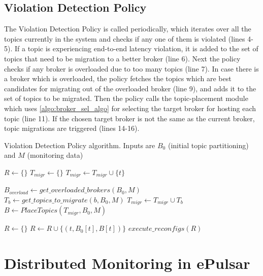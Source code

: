 \subsection{Violation Detection Policy}
The Violation Detection Policy is called periodically, which iterates over all the topics currently in the system and checks if any one of them is violated (lines 4-5). If a topic is experiencing end-to-end latency violation, it is added to the set of topics that need to be migration to a better broker (line 6). Next the policy checks if any broker is overloaded due to too many topics (line 7). In case there is a broker which is overloaded, the policy fetches the topics which are best candidates for migrating out of the overloaded broker (line 9), and adds it to the set of topics to be migrated. Then the policy calls the topic-placement module which uses \cref{algo:broker_sel_algo} for selecting the target broker for hosting each topic (line 11). If the chosen target broker is not the same as the current broker, topic migrations are triggered (lines 14-16).
\begin{algorithm}
\caption{Violation Detection Policy algorithm. Inputs are $B_0$ (initial topic partitioning) and $M$ (monitoring data)}\label{viol_detection_algo}
\begin{algorithmic}[1]
\State $R \gets \{\}$ 
\State $T_{migr} \gets \{\}$ 
        \State $T_{migr} \gets T_{migr} \cup \{ t \}$
    \EndIf
\EndFor

\State $B_{overload} \gets get\_overloaded\_brokers \left( B_0, M \right)$
 
    \State $T_b \gets get\_topics\_to\_migrate\left(b, B_0, M\right)$
    \State $T_{migr} \gets T_{migr} \cup T_b$
\EndFor
\State $B \gets PlaceTopics \left( T_{migr}, B_0, M \right)$ 

\State $R \gets \{\}$ 
        \State $R \gets R \cup \{ \left( t, B_0 \left[ t \right], B \left[ t \right]\right) \}$ 
    \EndIf
\EndFor
\State $execute\_reconfigs \left( R \right)$ 
\EndProcedure
\end{algorithmic}
\end{algorithm}

\section{Distributed Monitoring in ePulsar}
\label{sec:epulsar_dist_mon}
